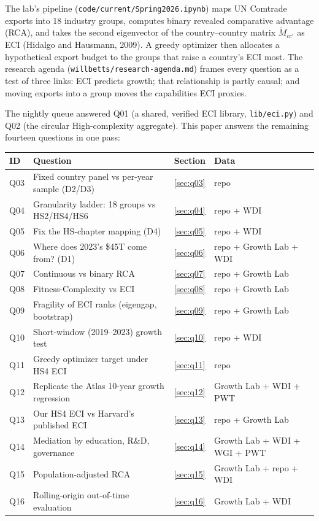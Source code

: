 \documentclass[11pt]{article}
\begin{document}
The lab's pipeline (\texttt{code/current/Spring2026.ipynb}) maps UN Comtrade exports into 18 industry groups, computes binary revealed comparative advantage (RCA), and takes the second eigenvector of the country--country matrix $\tilde M_{cc'}$ as ECI (Hidalgo and Hausmann, 2009). A greedy optimizer then allocates a hypothetical export budget to the groups that raise a country's ECI most. The research agenda (\texttt{willbetts/research-agenda.md}) frames every question as a test of three links: ECI predicts growth; that relationship is partly causal; and moving exports into a group moves the capabilities ECI proxies.

The nightly queue answered Q01 (a shared, verified ECI library, \texttt{lib/eci.py}) and Q02 (the circular High-complexity aggregate). This paper answers the remaining fourteen questions in one pass:

\begin{center}
\small
\begin{tabular}{llll}
\toprule
ID & Question & Section & Data \\
\midrule
Q03 & Fixed country panel vs per-year sample (D2/D3) & \ref{sec:q03} & repo \\
Q04 & Granularity ladder: 18 groups vs HS2/HS4/HS6 & \ref{sec:q04} & repo + WDI \\
Q05 & Fix the HS-chapter mapping (D4) & \ref{sec:q05} & repo + WDI \\
Q06 & Where does 2023's \$45T come from? (D1) & \ref{sec:q06} & repo + Growth Lab + WDI \\
Q07 & Continuous vs binary RCA & \ref{sec:q07} & repo + Growth Lab \\
Q08 & Fitness-Complexity vs ECI & \ref{sec:q08} & repo + Growth Lab \\
Q09 & Fragility of ECI ranks (eigengap, bootstrap) & \ref{sec:q09} & repo + Growth Lab \\
Q10 & Short-window (2019--2023) growth test & \ref{sec:q10} & repo + WDI \\
Q11 & Greedy optimizer target under HS4 ECI & \ref{sec:q11} & repo \\
Q12 & Replicate the Atlas 10-year growth regression & \ref{sec:q12} & Growth Lab + WDI + PWT \\
Q13 & Our HS4 ECI vs Harvard's published ECI & \ref{sec:q13} & repo + Growth Lab \\
Q14 & Mediation by education, R\&D, governance & \ref{sec:q14} & Growth Lab + WDI + WGI + PWT \\
Q15 & Population-adjusted RCA & \ref{sec:q15} & Growth Lab + repo + WDI \\
Q16 & Rolling-origin out-of-time evaluation & \ref{sec:q16} & Growth Lab + WDI \\
\bottomrule
\end{tabular}
\end{center}
\end{document}
